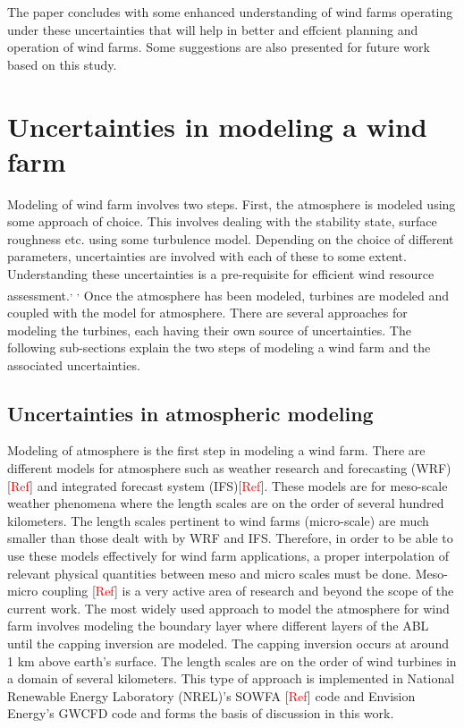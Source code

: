 \documentclass[]{aiaa-tc}%
\begin{document}
The paper concludes with some enhanced understanding of wind farms operating under these uncertainties that will help in better and effcient planning and operation of wind farms. Some suggestions are also presented for future work based on this study.

\section{Uncertainties in modeling a wind farm} \label{uq_windfarm}

Modeling of wind farm involves two steps. First, the atmosphere is modeled using some approach of choice. This involves dealing with the stability state, surface roughness etc. using some turbulence model. Depending on the choice of different parameters, uncertainties are involved with each of these to some extent. Understanding these uncertainties is a pre-requisite for efficient wind resource assessment.\cite{lackner:aiaa2007}\textsuperscript{, } \cite{lackner:asme2008}\textsuperscript{, } \cite{kwon:ae2010} Once the atmosphere has been modeled, turbines are modeled and coupled with the model for atmosphere. There are several approaches for modeling the turbines, each having their own source of uncertainties. The following sub-sections explain the two steps of modeling a wind farm and the associated uncertainties.

\subsection{Uncertainties in atmospheric modeling} \label{uq_abl}
Modeling of atmosphere is the first step in modeling a wind farm. There are different models for atmosphere such as weather research and forecasting (WRF)[\textcolor{red}{Ref}] and integrated forecast system (IFS)[\textcolor{red}{Ref}]. These models are for meso-scale weather phenomena where the length scales are on the order of several hundred kilometers. The length scales pertinent to wind farms (micro-scale) are much smaller than those dealt with by WRF and IFS. Therefore, in order to be able to use these models effectively for wind farm applications, a proper interpolation of relevant physical quantities between meso and micro scales must be done. Meso-micro coupling [\textcolor{red}{Ref}] is a very active area of research and beyond the scope of the current work. The most widely used approach to model the atmosphere for wind farm involves modeling the boundary layer where different layers of the ABL until the capping inversion are modeled. The capping inversion occurs at around 1 km above earth's surface. The length scales are on the order of wind turbines in a domain of several kilometers. This type of approach is implemented in National Renewable Energy Laboratory (NREL)'s SOWFA [\textcolor{red}{Ref}] code and Envision Energy's GWCFD code and forms the basis of discussion in this work.
\end{document}

